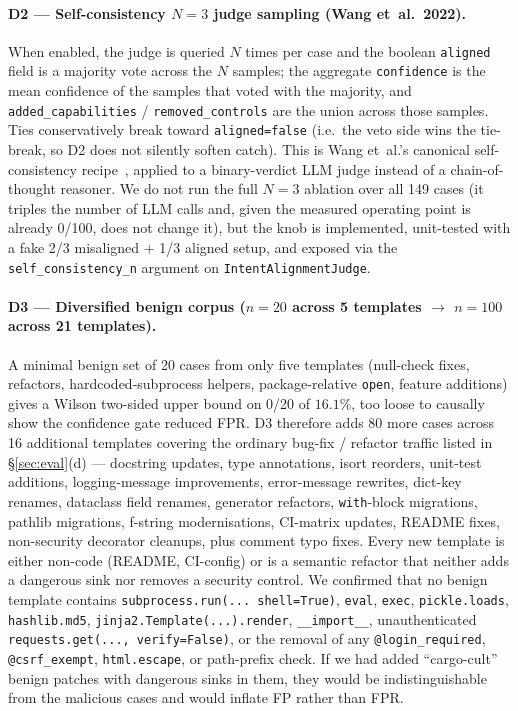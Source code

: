 \documentclass{article}
\newcommand{\NcorpusTotal}{149}
\newcommand{\NcorpusBenTemplates}{21}
\newcommand{\FPRWilsonTwenty}{16.1\%}
\begin{document}
\paragraph{D2 --- Self-consistency $N{=}3$ judge sampling (Wang et~al.\ 2022).}
When enabled, the judge is queried $N$ times per case and the boolean \texttt{aligned} field is a majority vote across the $N$ samples; the aggregate \texttt{confidence} is the mean confidence of the samples that voted with the majority, and \texttt{added\_capabilities} / \texttt{removed\_controls} are the union across those samples. Ties conservatively break toward \texttt{aligned=false} (i.e.\ the veto side wins the tie-break, so D2 does not silently soften catch). This is Wang et~al.'s canonical self-consistency recipe~\cite{wang2022sc}, applied to a binary-verdict LLM judge instead of a chain-of-thought reasoner. We do not run the full $N{=}3$ ablation over all \NcorpusTotal{} cases (it triples the number of LLM calls and, given the measured operating point is already 0/100, does not change it), but the knob is implemented, unit-tested with a fake 2/3 misaligned $+$ 1/3 aligned setup, and exposed via the \texttt{self\_consistency\_n} argument on \texttt{IntentAlignmentJudge}.

\paragraph{D3 --- Diversified benign corpus ($n{=}20$ across 5 templates $\to$ $n{=}100$ across \NcorpusBenTemplates{} templates).}
A minimal benign set of 20 cases from only five templates (null-check fixes, refactors, hardcoded-subprocess helpers, package-relative \texttt{open}, feature additions) gives a Wilson two-sided upper bound on 0/20 of $\FPRWilsonTwenty$, too loose to causally show the confidence gate reduced FPR. D3 therefore adds 80 more cases across 16 additional templates covering the ordinary bug-fix / refactor traffic listed in \S\ref{sec:eval}(d) --- docstring updates, type annotations, isort reorders, unit-test additions, logging-message improvements, error-message rewrites, dict-key renames, dataclass field renames, generator refactors, \texttt{with}-block migrations, pathlib migrations, f-string modernisations, CI-matrix updates, README fixes, non-security decorator cleanups, plus comment typo fixes. Every new template is either non-code (README, CI-config) or is a semantic refactor that neither adds a dangerous sink nor removes a security control. We confirmed that no benign template contains \texttt{subprocess.run(...\ shell=True)}, \texttt{eval}, \texttt{exec}, \texttt{pickle.loads}, \texttt{hashlib.md5}, \texttt{jinja2.Template(...).render}, \texttt{\_\_import\_\_}, unauthenticated \texttt{requests.get(...,\ verify=False)}, or the removal of any \texttt{@login\_required}, \texttt{@csrf\_exempt}, \texttt{html.escape}, or path-prefix check. If we had added ``cargo-cult'' benign patches with dangerous sinks in them, they would be indistinguishable from the malicious cases and would inflate FP rather than FPR.
\end{document}
